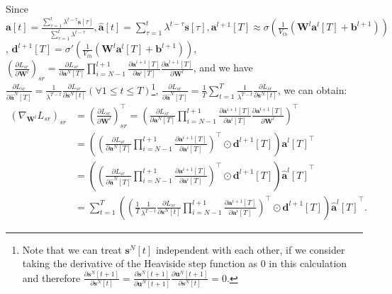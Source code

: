 \documentclass{article}
\begin{document}
Since $\mathbf{a}[t]=\frac{\sum_{\tau=1}^t \lambda^{t-\tau}\mathbf{s}[\tau]}{\sum_{\tau=1}^t \lambda^{t-\tau}}, \hat{\mathbf{a}}[t]=\sum_{\tau=1}^t \lambda^{t-\tau}\mathbf{s}[\tau], \mathbf{a}^{l+1}[T] \approx \sigma\left(\frac{1}{V_{th}}\left(\mathbf{W}^l\mathbf{a}^l[T]+\mathbf{b}^{l+1}\right)\right)$, $\mathbf{d}^{l+1}[T]=\sigma'\left(\frac{1}{V_{th}}\left(\mathbf{W}^l\mathbf{a}^l[T]+\mathbf{b}^{l+1}\right)\right)$, $\left(\frac{\partial L_{sr}}{\partial \mathbf{W}^l}\right)_{sr}=\frac{\partial L_{sr}}{\partial \mathbf{a}^N[T]}\prod_{i=N-1}^{l+1}\frac{\partial \mathbf{a}^{i+1}[T]}{\partial \mathbf{a}^i[T]}\frac{\partial \mathbf{a}^{l+1}[T]}{\partial \mathbf{W}^l}$, and we have $\frac{\partial L_{sr}}{\partial \hat{\mathbf{a}}^N[T]}=\frac{1}{\lambda^{T-t}}\frac{\partial L_{sr}}{\partial \mathbf{s}^N[t]} (\forall 1\leq t\leq T)$\footnote{Note that we can treat $\mathbf{s}^N[t]$ independent with each other, if we consider taking the derivative of the Heaviside step function as 0 in this calculation and therefore $\frac{\partial \mathbf{s}^N[t+1]}{\partial \mathbf{s}^N[t]}=\frac{\partial \mathbf{s}^N[t+1]}{\partial \mathbf{u}^N[t+1]}\frac{\partial \mathbf{u}^N[t+1]}{\partial \mathbf{s}^N[t]}=0$.}, $\frac{\partial L_{sr}}{\partial \hat{\mathbf{a}}^N[T]}=\frac{1}{T}\sum_{t=1}^T\frac{1}{\lambda^{T-t}}\frac{\partial L_{sr}}{\partial \mathbf{s}^N[t]}$, we can obtain:
\begin{equation}
\begin{aligned}
    \left(\nabla_{\mathbf{W}^l}L_{sr}\right)_{sr} &= \left(\frac{\partial L_{sr}}{\partial \mathbf{W}^l}\right)_{sr}^\top = \left(\frac{\partial L_{sr}}{\partial \mathbf{a}^N[T]}\prod_{i=N-1}^{l+1}\frac{\partial \mathbf{a}^{i+1}[T]}{\partial \mathbf{a}^i[T]}\frac{\partial \mathbf{a}^{l+1}[T]}{\partial \mathbf{W}^l}\right)^\top\\
    &= \left(\left(\frac{\partial L_{sr}}{\partial \mathbf{a}^N[T]}\prod_{i=N-1}^{l+1}\frac{\partial \mathbf{a}^{i+1}[T]}{\partial \mathbf{a}^i[T]}\right)^\top\odot \mathbf{d}^{l+1}[T]\right){\mathbf{a}^l[T]}^\top\\
    &= \left(\left(\frac{\partial L_{sr}}{\partial \hat{\mathbf{a}}^N[T]}\prod_{i=N-1}^{l+1}\frac{\partial \mathbf{a}^{i+1}[T]}{\partial \mathbf{a}^i[T]}\right)^\top\odot \mathbf{d}^{l+1}[T]\right){\hat{\mathbf{a}}^l[T]}^\top\\
    &= \sum_{t=1}^T\left(\left(\frac{1}{T}\frac{1}{\lambda^{T-t}}\frac{\partial L_{sr}}{\partial \mathbf{s}^N[t]}\prod_{i=N-1}^{l+1}\frac{\partial \mathbf{a}^{i+1}[T]}{\partial \mathbf{a}^i[T]}\right)^\top\odot \mathbf{d}^{l+1}[T]\right){\hat{\mathbf{a}}^l[T]}^\top.
\end{aligned}
\end{equation}
\end{document}
